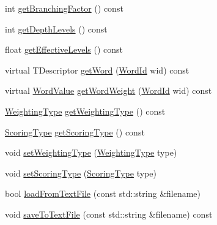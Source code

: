 \begin{DoxyCompactItemize}
\item 
int \mbox{\hyperlink{class_d_bo_w2_1_1_templated_vocabulary_a027d367760c39de816bee5ff0d969837}{get\+Branching\+Factor}} () const
\item 
int \mbox{\hyperlink{class_d_bo_w2_1_1_templated_vocabulary_a5a7d1b3ad0c705705d516a9a144e3f38}{get\+Depth\+Levels}} () const
\item 
float \mbox{\hyperlink{class_d_bo_w2_1_1_templated_vocabulary_ae67da4c7b30c15ed4faba2ad6ed4549e}{get\+Effective\+Levels}} () const
\item 
virtual T\+Descriptor \mbox{\hyperlink{class_d_bo_w2_1_1_templated_vocabulary_a3f0d8b15b4f673bf9888ff23489430b4}{get\+Word}} (\mbox{\hyperlink{namespace_d_bo_w2_ab1a0d3283b2d4690a383372ed20bfeb5}{Word\+Id}} wid) const
\item 
virtual \mbox{\hyperlink{namespace_d_bo_w2_a55fcd7333e591a38e96b91f41bc182f6}{Word\+Value}} \mbox{\hyperlink{class_d_bo_w2_1_1_templated_vocabulary_ace5645b42739bea1e3da05c6cff60bad}{get\+Word\+Weight}} (\mbox{\hyperlink{namespace_d_bo_w2_ab1a0d3283b2d4690a383372ed20bfeb5}{Word\+Id}} wid) const
\item 
\mbox{\hyperlink{namespace_d_bo_w2_a5de5c8a307aca9a84ffefda2a9bc467a}{Weighting\+Type}} \mbox{\hyperlink{class_d_bo_w2_1_1_templated_vocabulary_aadb9343da87e0f00ed3da401c59132b2}{get\+Weighting\+Type}} () const
\item 
\mbox{\hyperlink{namespace_d_bo_w2_aa252a592dd607c6e60dede06ceef2722}{Scoring\+Type}} \mbox{\hyperlink{class_d_bo_w2_1_1_templated_vocabulary_ad830e1e3e547e5d9d45971662afca3d5}{get\+Scoring\+Type}} () const
\item 
void \mbox{\hyperlink{class_d_bo_w2_1_1_templated_vocabulary_aa8f63a3379debd40214899d996cfc733}{set\+Weighting\+Type}} (\mbox{\hyperlink{namespace_d_bo_w2_a5de5c8a307aca9a84ffefda2a9bc467a}{Weighting\+Type}} type)
\item 
void \mbox{\hyperlink{class_d_bo_w2_1_1_templated_vocabulary_a05a6c2f46184618c9ea8368f53e6980c}{set\+Scoring\+Type}} (\mbox{\hyperlink{namespace_d_bo_w2_aa252a592dd607c6e60dede06ceef2722}{Scoring\+Type}} type)
\item 
bool \mbox{\hyperlink{class_d_bo_w2_1_1_templated_vocabulary_a5447d0744100254c4da88ea039fb3414}{load\+From\+Text\+File}} (const std\+::string \&filename)
\item 
void \mbox{\hyperlink{class_d_bo_w2_1_1_templated_vocabulary_a1338b014b856d0a17e71010f6488548e}{save\+To\+Text\+File}} (const std\+::string \&filename) const
\item 

\end{DoxyCompactItemize}
